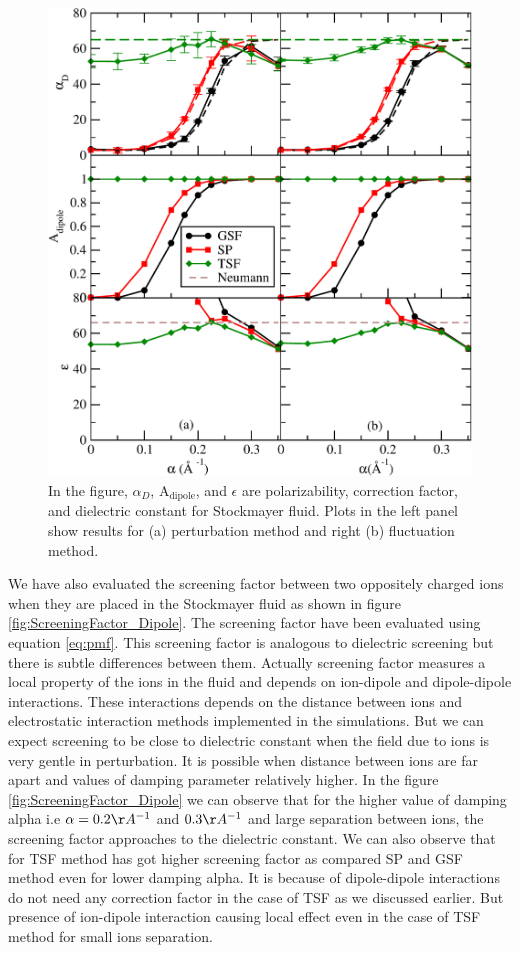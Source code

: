 \begin{figure}
  \centering
  \includegraphics[width=\linewidth]{dielectricFinal_Dipole.pdf}
\caption{In the figure, $\alpha_D$, $\mathrm{A}_\mathrm{dipole}$, and $\epsilon$  are polarizability, correction factor, and dielectric constant for Stockmayer fluid. Plots in the left panel show results for (a) perturbation method and right (b) fluctuation method.}
\label{fig:dielectricDipole}
\end{figure}

We have also evaluated the screening factor between two oppositely charged ions when they are placed in the Stockmayer fluid as shown in figure \ref{fig:ScreeningFactor_Dipole}. The screening factor have been evaluated using equation \ref{eq:pmf}. This screening factor is analogous to dielectric screening but there is subtle differences between them. Actually screening factor measures a local property of the ions in the fluid and depends on ion-dipole and dipole-dipole interactions. These interactions depends on the distance between ions and electrostatic interaction methods implemented in the simulations. But we can expect screening to be close to dielectric constant when the field due to ions is very gentle in perturbation. It is possible when distance between ions are far apart and values of damping parameter relatively higher. In the figure \ref{fig:ScreeningFactor_Dipole} we can observe that for the higher value of damping alpha i.e $\alpha = 0.2 \AA^{-1}$ and $0.3 \AA^{-1}$ and large separation between ions, the screening factor approaches to the dielectric constant. We can also  observe that for TSF method has got higher screening factor as compared SP and GSF method even for lower damping alpha. It is because of dipole-dipole interactions do not need any correction factor in the case of TSF as we discussed earlier. But presence of ion-dipole interaction causing local effect even in the case of TSF method for small ions separation.

